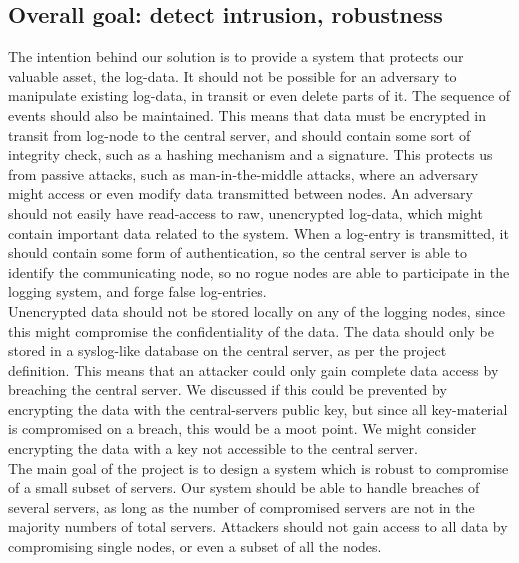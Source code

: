 \subsection{Overall goal: detect intrusion, robustness}

The intention behind our solution is to provide a system that protects our valuable asset, the log-data. It should not be possible for an adversary to manipulate existing log-data, in transit or even delete parts of it. The sequence of events should also be maintained. This means that data must be encrypted in transit from log-node to the central server, and should contain some sort of integrity check, such as a hashing mechanism and a signature. This protects us from passive attacks, such as man-in-the-middle attacks, where an adversary might access or even modify data transmitted between nodes.
An adversary should not easily have read-access to raw, unencrypted log-data, which might contain important data related to the system. When a log-entry is transmitted, it should contain some form of authentication, so the central server is able to identify the communicating node, so no rogue nodes are able to participate in the logging system, and forge false log-entries.
\\Unencrypted data should not be stored locally on any of the logging nodes, since this might compromise the confidentiality of the data. The data should only be stored in a syslog-like database on the central server, as per the project definition. This means that an attacker could  only gain complete data access by breaching the central server. We discussed if this could be prevented by encrypting the data with the central-servers public key, but since all key-material is compromised on a breach, this would be a moot point. We might consider encrypting the data with a key not accessible to the central server.
\\The main goal of the project is to design a system which is robust to compromise of a small subset of servers. Our system should be able to handle breaches of several servers, as long as the number of compromised servers are not in the majority numbers of total servers.
Attackers should not gain access to all data by compromising single nodes, or even a subset of all the nodes.


